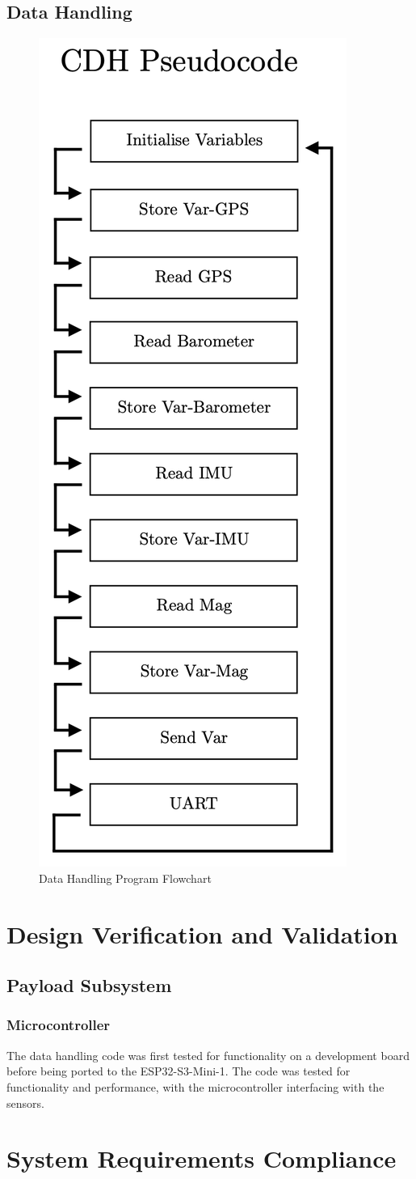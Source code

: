 \documentclass{report}
\begin{document}
        \section{Data Handling}
            \begin{figure}[H]
                \centering
                \includegraphics[width=0.2\linewidth]{figures/CDH_CODE.png}
                \caption{Data Handling Program Flowchart}
                \label{fig:cdh}
            \end{figure}
    \chapter{Design Verification and Validation}
        \section{Payload Subsystem}
            \subsection{Microcontroller}
                The data handling code was first tested for functionality
                on a development board before being ported to the 
                ESP32-S3-Mini-1. The code was tested for functionality
                and performance, with the microcontroller interfacing
                with the sensors.
        \chapter{System Requirements Compliance}
    \printbibliography
\end{document}
